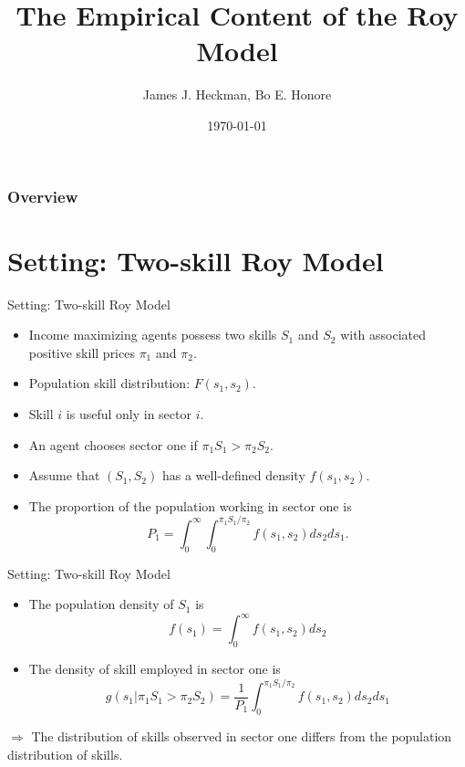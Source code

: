 \documentclass{beamer}
\title[Econometrica, 1990]{The Empirical Content of the Roy Model}
\author{James J. Heckman, Bo E. Honore}
\institute[]{Presenter: Qinzhu Sun}
\date{\today} %
\begin{document}
\begin{frame}
\titlepage %
\end{frame}

\begin{frame}
\frametitle{Overview}
\tableofcontents %
\end{frame}


\section{Setting: Two-skill Roy Model} 

\begin{frame}{Setting: Two-skill Roy Model}
	\begin{itemize}
	\item Income maximizing agents possess two skills $S_1$ and $S_2$ with associated positive skill prices $\pi_1$ and $\pi_2$.
	\pause
	\item Population skill distribution: $F(s_1,s_2)$.
	\pause
	\item Skill $i$ is useful only in sector $i$.
	\pause
	\item An agent chooses sector one if $\pi_1S_1>\pi_2S_2$.
	\pause
	\item Assume that $(S_1,S_2)$ has a well-defined density $f(s_1,s_2)$.
	\pause
	\item The proportion of the population working in sector one is 
	$$P_1=\int^\infty_0\int^{\pi_1S_1/\pi_2}_0f(s_1,s_2)ds_2ds_1.$$
	\end{itemize}
\end{frame}

\begin{frame}{Setting: Two-skill Roy Model}
	\begin{itemize}
	\item The population density of $S_1$ is
	$$f(s_1)=\int^\infty_0f(s_1,s_2)ds_2$$
	\pause
	\item The density  of skill employed in sector one is
	$$g(s_1|\pi_1S_1>\pi_2S_2)=\frac{1}{P_1}\int^{\pi_1S_1/\pi_2}_0f(s_1,s_2)ds_2ds_1$$
	\end{itemize}
\pause
$\Rightarrow$
The distribution of skills observed in sector one differs from the population distribution of skills.
\end{frame}
\end{document}
